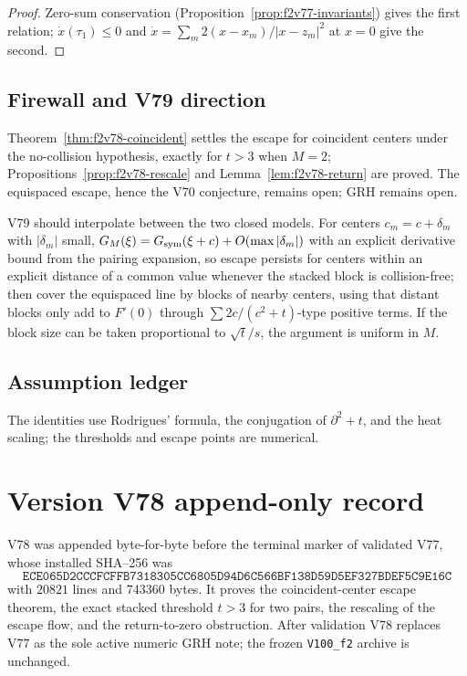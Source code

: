 \documentclass[11pt]{article}
\theoremstyle{definition}
\theoremstyle{remark}
\begin{document}
\begin{proof}
Zero-sum conservation (Proposition~\ref{prop:f2v77-invariants}) gives the
first relation; \(\dot x(\tau_1)\le0\) and
\(\dot x=\sum_m2(x-x_m)/|x-z_m|^2\) at \(x=0\) give the second.
\end{proof}

\subsection*{Firewall and V79 direction}
\label{fire:f2v78}
Theorem~\ref{thm:f2v78-coincident} settles the escape for coincident
centers under the no-collision hypothesis, exactly for \(t>3\) when
\(M=2\); Propositions~\ref{prop:f2v78-rescale} and
Lemma~\ref{lem:f2v78-return} are proved.  The equispaced escape, hence
the V70 conjecture, remains open; GRH remains open.

V79 should interpolate between the two closed models.  For centers
\(c_m=c+\delta_m\) with \(|\delta_m|\) small, \(G_M(\xi)=G_{\rm sym}(\xi+c)+O(\max|\delta_m|)\)
with an explicit derivative bound from the pairing expansion, so escape
persists for centers within an explicit distance of a common value
whenever the stacked block is collision-free; then cover the equispaced
line by blocks of nearby centers, using that distant blocks only add to
\(F'(0)\) through \(\sum2c/(c^2+t)\)-type positive terms.  If the block
size can be taken proportional to \(\sqrt t/s\), the argument is uniform
in \(M\).

\subsection*{Assumption ledger}
\label{ass:f2v78}
The identities use Rodrigues' formula, the conjugation of
\(\partial^2+t\), and the heat scaling; the thresholds and escape points
are numerical.
\endgroup

\section*{Version V78 append-only record}

V78 was appended byte-for-byte before the terminal marker of validated
V77, whose installed SHA--256 was
\[
 \texttt{ECE065D2CCCFCFFB7318305CC6805D94}
 \allowbreak\texttt{D6C566BF138D59D5EF327BDEF5C9E16C}
\]
with \(20821\) lines and \(743360\) bytes.  It proves the
coincident-center escape theorem, the exact stacked threshold \(t>3\)
for two pairs, the rescaling of the escape flow, and the return-to-zero
obstruction.  After validation V78 replaces V77 as the sole active
numeric GRH note; the frozen \texttt{V100\_f2} archive is unchanged.
\end{document}

